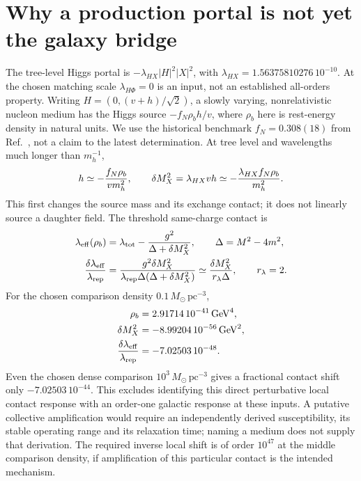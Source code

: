 \documentclass[11pt]{article}
\begin{document}
\section{Why a production portal is not yet the galaxy bridge}
The tree-level Higgs portal is
$-\lambda_{HX}|H|^2|X|^2$, with
$\lambda_{HX}=1.56375810276\,10^{-10}$. At the chosen matching scale
$\lambda_{H\Phi}=0$ is an input, not an established all-orders property.
Writing $H=(0,(v+h)/\sqrt2)$, a slowly varying, nonrelativistic nucleon
medium has the Higgs source $-f_N\rho_b h/v$, where $\rho_b$ here is
rest-energy density in natural units. We use the historical benchmark
$f_N=0.308(18)$ from Ref.~\cite{ag:hoferichter}, not a claim to the latest
determination. At tree level and wavelengths much longer than $m_h^{-1}$,
\begin{equation}
 h\simeq-{f_N\rho_b\over v m_h^2},\qquad
 \delta M_X^2=\lambda_{HX}vh
            \simeq-{\lambda_{HX}f_N\rho_b\over m_h^2}.
 \label{ag:higgsresponse}
\end{equation}
This first changes the source mass and its exchange contact; it does not
linearly source a daughter field. The threshold same-charge contact is
\begin{align}
 \lambda_{\rm eff}(\rho_b)&=\lambda_{\rm tot}
                    -{g^2\over\Delta+\delta M_X^2},
       \qquad \Delta=M^2-4m^2,\\
 {\delta\lambda_{\rm eff}\over\lambda_{\rm rep}}
   &= {g^2\delta M_X^2\over
            \lambda_{\rm rep}\Delta(\Delta+\delta M_X^2)}
     \simeq {\delta M_X^2\over r_\lambda\Delta},
       \qquad r_\lambda=2.
\end{align}
For the chosen comparison density $0.1\,M_\odot\,\mathrm{pc}^{-3}$,
\begin{align}
 \rho_b&=2.91714\,10^{-41}\,\mathrm{GeV}^4,\\
 \delta M_X^2&=-8.99204\,10^{-56}\,\mathrm{GeV}^2,\\
 {\delta\lambda_{\rm eff}\over\lambda_{\rm rep}}
   &=-7.02503\,10^{-48}.
\end{align}
Even the chosen dense comparison $10^3\,M_\odot\,\mathrm{pc}^{-3}$
gives a fractional contact shift only $-7.02503\,10^{-44}$.
This excludes identifying this direct perturbative local contact response
with an order-one galactic response at these inputs. A putative collective
amplification would require an independently derived susceptibility, its
stable operating range and its relaxation time; naming a medium does not
supply that derivation. The required inverse local shift is of order
$10^{47}$ at the middle comparison density, if amplification of this
particular contact is the intended mechanism.
\end{document}
